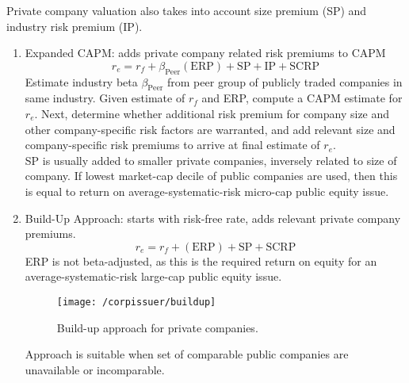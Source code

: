 \begin{method}
Private company valuation also takes into account size premium (SP) and industry risk premium (IP).
\begin{enumerate}[label=\roman*.]
\setlength{\itemsep}{0pt}
\item Expanded CAPM: adds private company related risk premiums to CAPM
\begin{equation}
r_e = r_f + \beta_{\text{Peer}}(\text{ERP}) + \text{SP} + \text{IP} + \text{SCRP} \nonumber
\end{equation}
Estimate industry beta $\beta_{\text{Peer}}$ from peer group of publicly traded companies in same industry. Given estimate of $r_f$ and ERP, compute a CAPM estimate for $r_e$. Next, determine whether additional risk premium for company size and other company-specific risk factors are warranted, and add relevant size and company-specific risk premiums to arrive at final estimate of $r_e$.\\
SP is usually added to smaller private companies, inversely related to size of company. If lowest market-cap decile of public companies are used, then this is equal to return on average-systematic-risk micro-cap public equity issue. 
\item Build-Up Approach: starts with risk-free rate, adds relevant private company premiums.
\begin{equation}
r_e = r_f + (\text{ERP}) + \text{SP} + \text{SCRP} \nonumber
\end{equation}
ERP is not beta-adjusted, as this is the required return on equity for an average-systematic-risk large-cap public equity issue. 
\begin{figure}[H]
\centering
\texttt{[image: /corpissuer/buildup]}
\caption{Build-up approach for private companies.}
\end{figure}
Approach is suitable when set of comparable public companies are unavailable or incomparable.
\end{enumerate}
\end{method}

